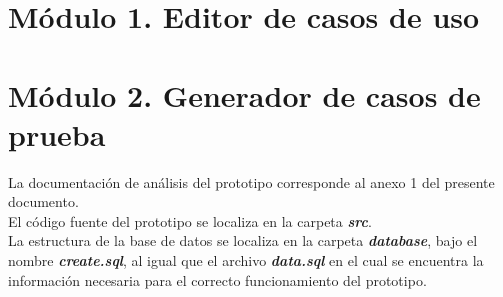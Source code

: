 \section{Módulo 1. Editor de casos de uso}

\section{Módulo 2. Generador de casos de prueba}

	La documentación de análisis del prototipo corresponde al anexo 1 del presente documento.\\

	El código fuente del prototipo se localiza en la carpeta {\bf \it src}.\\
	
	La estructura de la base de datos se localiza en la carpeta {\bf \it database}, bajo el nombre {\bf \it create.sql}, al igual que el archivo {\bf \it data.sql} en el cual se encuentra la información necesaria para el correcto funcionamiento del prototipo. 